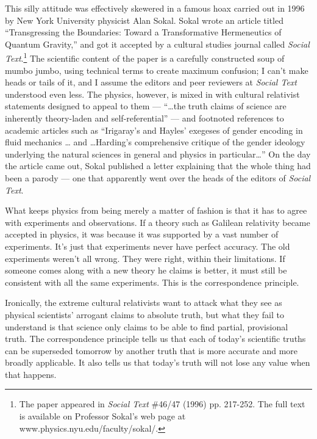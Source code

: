 This silly attitude was effectively skewered in a famous hoax
carried out in 1996 by New York University physicist Alan Sokal. Sokal wrote
an article titled ``Transgressing the Boundaries: Toward a Transformative 
Hermeneutics of Quantum Gravity,'' and got it accepted by a cultural studies
journal called \emph{Social Text}.\footnote{The paper
appeared in \emph{Social Text} \#46/47 (1996) pp. 217-252. The full text
is available on Professor Sokal's web page at www.physics.nyu.edu/faculty/sokal/.}
The scientific content of the paper is a carefully constructed soup of
mumbo jumbo, using technical terms to create maximum confusion; I can't make
heads or tails of it, and I assume the editors and peer reviewers at
\emph{Social Text} understood even less. The physics, however, is mixed
in with cultural relativist statements designed to appeal to them ---
``\ldots the truth claims of science are inherently theory-laden and self-referential'' ---
and footnoted references to academic articles such as 
``Irigaray's and Hayles' exegeses of gender encoding in fluid mechanics \ldots
and \ldots Harding's comprehensive critique of the gender ideology underlying
the natural sciences in general and physics in particular\ldots''
On the day the article came out, Sokal published a letter explaining that
the whole thing had been a parody --- one that apparently went over the heads
of the editors of \emph{Social Text}.

What keeps physics from being merely a matter of fashion is that it has to agree
with experiments and observations. If a theory such as Galilean relativity
became accepted in physics, it was because it was supported
by a vast number of experiments. It's just that experiments never have perfect
accuracy. The old experiments weren't all
wrong. They were right, within their limitations. If someone comes along with a
new theory he claims is better, it must still be consistent with all the same
experiments. This is the correspondence principle.

Ironically, the extreme cultural relativists want to attack what they see
as physical scientists' arrogant claims to absolute truth, but what they
fail to understand is that science only claims to be able to find partial, provisional truth.
The correspondence principle tells us that each of today's scientific truths can be superseded
tomorrow by another truth that is more accurate and more broadly applicable. It also
tells us that today's truth will not lose any value when that happens.
